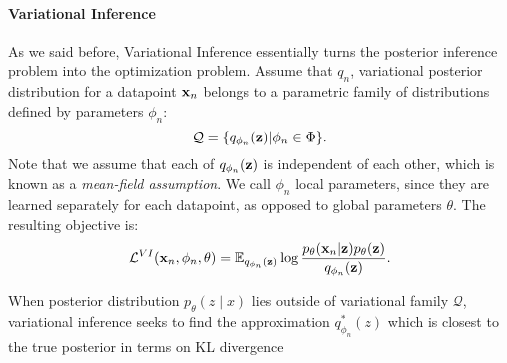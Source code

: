 \paragraph{Variational Inference}
As we said before, Variational Inference essentially turns the posterior inference problem into the optimization problem.
Assume that $q_n$,  variational posterior distribution for a datapoint ${\mathbf{x}}_n$ belongs to a parametric family of distributions defined by parameters $\phi_n$:
\begin{equation}
    \mathcal{Q} = \{q_{\phi_n}({\mathbf{z}}) | \phi_n \in \Phi\}.
\end{equation}
Note that we assume that each of $q_{\phi_n}({\mathbf{z}})$ is independent of each other, which is known as a \textit{mean-field assumption}. We call $\phi_n$ local parameters, since they are learned separately for each datapoint, as opposed to global parameters $\theta$. The resulting objective is: 
\begin{equation}
     \mathcal{L}^{VI}({\mathbf{x}}_n, \phi_n, \theta) =  \mathbb{E}_{q_{\phi_n}({\mathbf{z}})}\log  \frac{p_{\theta}({\mathbf{x}}_n|{\mathbf{z}})p_{\theta}({\mathbf{z}})}{q_{\phi_n}({\mathbf{z}})}.
\end{equation}
\begin{marginfigure}
\caption{When posterior distribution $ p_{\theta}(z \mid x) $ lies outside of variational family $\mathcal{Q}$, variational inference seeks to find the approximation $q^*_{\phi_n}(z) $ which is closest to the true posterior in terms on KL divergence} \label{fig:intro_vi}
\end{marginfigure}
